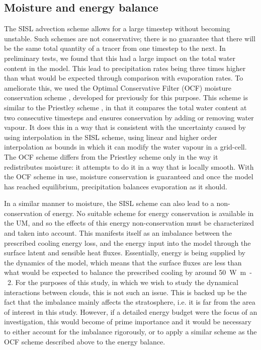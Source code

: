 \documentclass[11pt,a4paper]{article}
\begin{document}
\subsection{Moisture and energy balance}

The SISL advection scheme allows for a large timestep without becoming unstable. Such schemes are not conservative; there is no guarantee that there will be the same total quantity of a tracer from one timestep to the next. In preliminary tests, we found that this had a large impact on the total water content in the model. This lead to precipitation rates being three times higher than what would be expected through comparison with evaporation rates. To ameliorate this, we used the Optimal Conservative Filter (OCF) moisture conservation scheme \parencite{zerroukat2015monotonic}, developed for previously for this purpose. This scheme is similar to the Priestley scheme \parencite{priestley1993quasi}, in that it compares the total water content at two consecutive timesteps and ensures conservation by adding or removing water vapour. It does this in a way that is consistent with the uncertainty caused by using interpolation in the SISL scheme, using linear and higher order interpolation as bounds in which it can modify the water vapour in a grid-cell. The OCF scheme differs from the Priestley scheme only in the way it redistributes moisture: it attempts to do it in a way that is locally smooth. With the OCF scheme in use, moisture conservation is guaranteed and once the model has reached equilibrium, precipitation balances evaporation as it should.

In a similar manner to moisture, the SISL scheme can also lead to a non-conservation of energy. No suitable scheme for energy conservation is available in the UM, and so the effects of this energy non-conservation must be characterized and taken into account. This manifests itself as an imbalance between the prescribed cooling energy loss, and the energy input into the model through the surface latent and sensible heat fluxes. Essentially, energy is being supplied by the dynamics of the model, which means that the surface fluxes are less than what would be expected to balance the prescribed cooling by around \SI{50}{W.m-2}.
For the purposes of this study, in which we wish to study the dynamical interactions between clouds, this is not such an issue. This is backed up be the fact that the imbalance mainly affects the stratosphere, i.e. it is far from the area of interest in this study. However, if a detailed energy budget were the focus of an investigation, this would become of prime importance and it would be necessary to either account for the imbalance rigorously, or to apply a similar scheme as the OCF scheme described above to the energy balance. 
\end{document}
